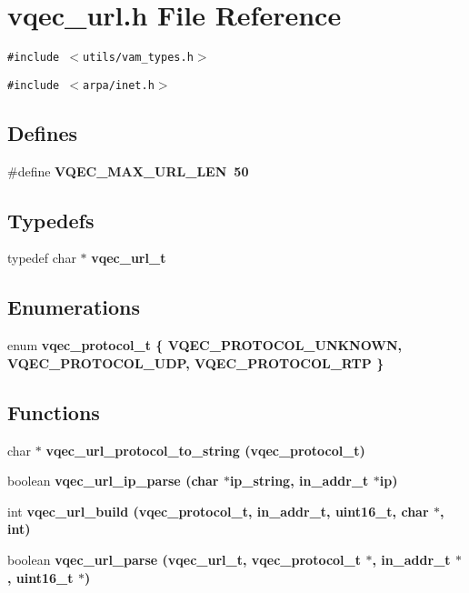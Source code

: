 \section{vqec\_\-url.h File Reference}
\label{vqec__url_8h}
{\tt \#include $<$utils/vam\_\-types.h$>$}\par
{\tt \#include $<$arpa/inet.h$>$}\par
\subsection*{Defines}
\begin{CompactItemize}
\item 
\#define \bf{VQEC\_\-MAX\_\-URL\_\-LEN}~50
\end{CompactItemize}
\subsection*{Typedefs}
\begin{CompactItemize}
\item 
typedef char $\ast$ \bf{vqec\_\-url\_\-t}
\end{CompactItemize}
\subsection*{Enumerations}
\begin{CompactItemize}
\item 
enum \bf{vqec\_\-protocol\_\-t} \{ \bf{VQEC\_\-PROTOCOL\_\-UNKNOWN}, 
\bf{VQEC\_\-PROTOCOL\_\-UDP}, 
\bf{VQEC\_\-PROTOCOL\_\-RTP}
 \}
\end{CompactItemize}
\subsection*{Functions}
\begin{CompactItemize}
\item 
char $\ast$ \bf{vqec\_\-url\_\-protocol\_\-to\_\-string} (\bf{vqec\_\-protocol\_\-t})
\item 
boolean \bf{vqec\_\-url\_\-ip\_\-parse} (char $\ast$ip\_\-string, in\_\-addr\_\-t $\ast$ip)
\item 
int \bf{vqec\_\-url\_\-build} (\bf{vqec\_\-protocol\_\-t}, in\_\-addr\_\-t, uint16\_\-t, char $\ast$, int)
\item 
boolean \bf{vqec\_\-url\_\-parse} (\bf{vqec\_\-url\_\-t}, \bf{vqec\_\-protocol\_\-t} $\ast$, in\_\-addr\_\-t $\ast$, uint16\_\-t $\ast$)
\end{CompactItemize}


